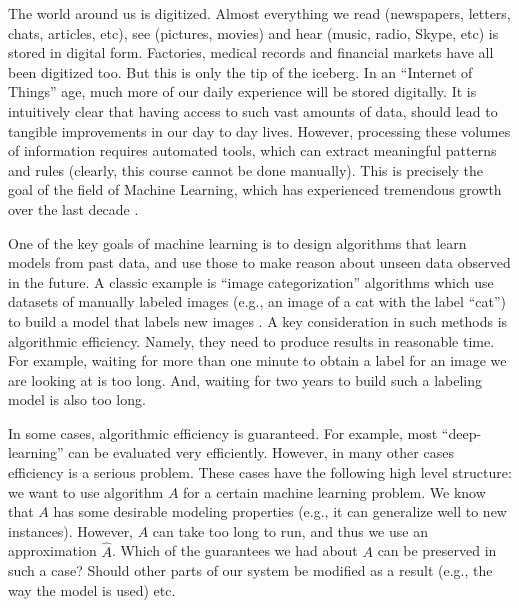 The world around us is digitized.
Almost everything we read (newspapers, letters, chats, articles, etc), see (pictures, movies) and hear (music, radio, Skype, etc) is stored in digital form.
Factories, medical records and financial markets have all been digitized too.
But this is only the tip of the iceberg. In an ``Internet of Things'' age, much more of our daily experience will be stored digitally.  
It is intuitively clear that having access to such vast amounts of data, should lead to tangible improvements in our day to day lives. However, processing these volumes of information requires automated tools, which can extract meaningful patterns and rules (clearly, this course cannot be done manually). This is precisely the goal of the field of Machine Learning, which has experienced tremendous growth over the last decade  \cite{Bishop:2006}.


One of the key goals of machine learning is to design algorithms that learn models from past data, and use those to make reason about unseen data observed in the future. A classic example is ``image categorization'' algorithms which use datasets of manually labeled images (e.g., an image of a cat with the label ``cat'') to build a model that labels new images \cite{krizhevsky2012imagenet}. A key consideration in such methods is algorithmic efficiency. Namely, they need to produce results in reasonable time. For example, waiting for more than one minute to obtain a label for an image we are looking at is too long. And, waiting for two years to build such a labeling model is also too long. 

In some cases, algorithmic efficiency is guaranteed. For example, most ``deep-learning'' can be evaluated very efficiently. However, in many other cases efficiency is a serious problem. These cases have the following high level structure: we want to use algorithm $A$ for a certain machine learning problem. We know that $A$ has some desirable modeling properties (e.g., it can generalize well to new instances). However, $A$ can take too long to run, and thus we use an approximation $\hat{A}$. Which of the guarantees we had about $A$ can be preserved in such a case? Should other parts of our system be modified as a result (e.g., the way the model is used) etc. 

